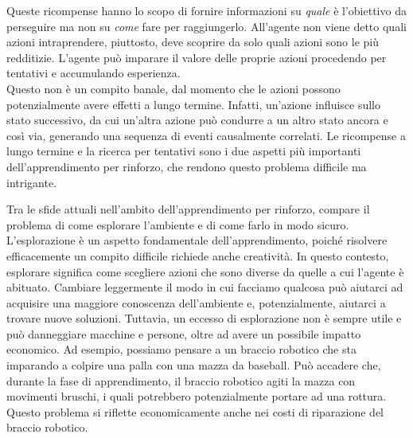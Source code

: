 Queste ricompense hanno lo scopo di fornire informazioni su \textit{quale} è l'obiettivo da perseguire ma non su \textit{come} fare per raggiungerlo. All'agente non viene detto quali azioni intraprendere, piuttosto, deve scoprire da solo quali azioni sono le più redditizie. 
L'agente può imparare il valore delle proprie azioni procedendo per tentativi e accumulando esperienza.\\
Questo non è un compito banale, dal momento che le azioni possono potenzialmente avere effetti a lungo termine. Infatti, un'azione influisce sullo stato successivo, da cui un'altra azione può condurre a un altro stato ancora e così via, generando una sequenza di eventi causalmente correlati. Le ricompense a lungo termine e la ricerca per tentativi sono i due aspetti più importanti dell'apprendimento per rinforzo, che rendono questo problema difficile ma intrigante.

Tra le sfide attuali nell'ambito dell'apprendimento per rinforzo, compare il problema di come esplorare l'ambiente e di come farlo in modo sicuro. L'esplorazione è un aspetto fondamentale dell'apprendimento, poiché risolvere efficacemente un compito difficile richiede anche creatività. In questo contesto, esplorare significa come scegliere azioni che sono diverse da quelle a cui l'agente è abituato. Cambiare leggermente il modo in cui facciamo qualcosa può aiutarci ad acquisire una maggiore conoscenza dell'ambiente e, potenzialmente, aiutarci a trovare nuove soluzioni. Tuttavia, un eccesso di esplorazione non è sempre utile e può danneggiare macchine e persone, oltre ad avere un possibile impatto economico. Ad esempio, possiamo pensare a un braccio robotico che sta imparando a colpire una palla con una mazza da baseball. Può accadere che, durante la fase di apprendimento, il braccio robotico agiti la mazza con movimenti bruschi, i quali potrebbero potenzialmente portare ad una rottura. Questo problema si riflette economicamente anche nei costi di riparazione del braccio robotico.

